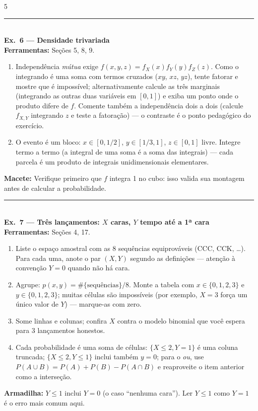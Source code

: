 \documentclass[a4paper,8pt]{extarticle}
\newcommand{\tit}[1]{\vspace{2pt}\textcolor{azul}{\rule{\linewidth}{0.6pt}}\\[1pt]\textbf{\textcolor{azul}{#1}}\\[1pt]}
\newcommand{\mac}[1]{\textcolor{verde}{\textbf{Macete:}} #1\par}
\newcommand{\arm}[1]{\textcolor{vinho}{\textbf{Armadilha:}} #1\par}
\newcommand{\ferr}[1]{\textbf{Ferramentas:} #1\par}
\begin{document}
\begin{multicols*}{5}
\tit{Ex.\ 6 — Densidade trivariada}
\ferr{Seções 5, 8, 9.}
\begin{enumerate}
\item[(a)] Independência \emph{mútua} exige $f(x,y,z)=f_X(x)f_Y(y)f_Z(z)$. Como o integrando é uma soma com termos cruzados ($xy$, $xz$, $yz$), tente fatorar e mostre que é impossível; alternativamente calcule as três marginais (integrando as outras duas variáveis em $[0,1]$) e exiba um ponto onde o produto difere de $f$. Comente também a independência dois a dois (calcule $f_{X,Y}$ integrando $z$ e teste a fatoração) — o contraste é o ponto pedagógico do exercício.
\item[(b)] O evento é um bloco: $x\in[0,1/2]$, $y\in[1/3,1]$, $z\in[0,1]$ livre. Integre termo a termo (a integral de uma soma é a soma das integrais) — cada parcela é um produto de integrais unidimensionais elementares.
\end{enumerate}
\mac{Verifique primeiro que $f$ integra 1 no cubo: isso valida sua montagem antes de calcular a probabilidade.}

\tit{Ex.\ 7 — Três lançamentos: $X$ caras, $Y$ tempo até a 1ª cara}
\ferr{Seções 4, 17.}
\begin{enumerate}
\item Liste o espaço amostral com as 8 sequências equiprováveis (CCC, CCK, \dots). Para cada uma, anote o par $(X,Y)$ segundo as definições — atenção à convenção $Y=0$ quando não há cara.
\item[(a)] Agrupe: $p(x,y)=\#\{\text{sequências}\}/8$. Monte a tabela com $x\in\{0,1,2,3\}$ e $y\in\{0,1,2,3\}$; muitas células são impossíveis (por exemplo, $X=3$ força um único valor de $Y$) — marque-as com zero.
\item[(b)] Some linhas e colunas; confira $X$ contra o modelo binomial que você espera para 3 lançamentos honestos.
\item[(c)] Cada probabilidade é uma soma de células: $\{X\le2, Y=1\}$ é uma coluna truncada; $\{X\le2,Y\le1\}$ inclui também $y=0$; para o \emph{ou}, use $P(A\cup B)=P(A)+P(B)-P(A\cap B)$ e reaproveite o item anterior como a interseção.
\end{enumerate}
\arm{$Y\le 1$ inclui $Y=0$ (o caso “nenhuma cara”). Ler $Y\le1$ como $Y=1$ é o erro mais comum aqui.}


\end{multicols*}
\end{document}
